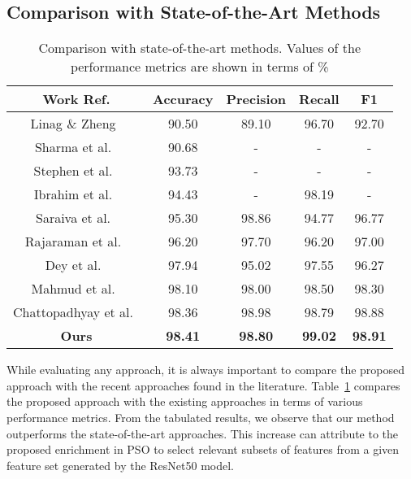 \documentclass[final,3p,times]{elsarticle}
\begin{document}
\subsection{Comparison with State-of-the-Art Methods}
\begin{table}[ht!]
    \centering
    \caption{Comparison with state-of-the-art methods. Values of the performance metrics are shown in terms of \%}
    \begin{adjustbox}{max width=\linewidth}
    \begin{tabular}{c|cccc}
    \toprule
        Work Ref. & Accuracy & Precision & Recall & F1  \\
        \midrule
        Linag \& Zheng~\cite{liang2020transfer} & 90.50 & 89.10 & 96.70& 92.70\\
        Sharma et al.~\cite{sharma2020feature}& 90.68 & - & - & -\\
        Stephen et al.~\cite{stephen2019efficient} & 93.73 & - & - & -\\
        Ibrahim et al.~\cite{ibrahim2021Pneumonia} & 94.43 & - & 98.19 & -\\
        Saraiva et al.~\cite{saraiva2019classification} & 95.30 & 98.86 & 94.77 & 96.77\\
        Rajaraman et al.~\cite{rajaraman2018visualization} & 96.20 & 97.70 & 96.20 & 97.00\\
        Dey et al.~\cite{dey2021customized} & 97.94& 95.02& 97.55& 96.27\\
        Mahmud et al.~\cite{mahmud2020covxnet} & 98.10 & 98.00& 98.50& 98.30\\
        Chattopadhyay et al.~\cite{chattopadhyay2021Pneumonia} & 98.36 & 98.98 & 98.79 & 98.88\\
        \midrule
        \textbf{Ours} & \textbf{98.41} & \textbf{98.80} & \textbf{99.02} & \textbf{98.91}\\
        \bottomrule
    \end{tabular}
    \end{adjustbox}
    \label{tab:sota}
\end{table}
While evaluating any approach, it is always important to compare {the proposed approach} with the {recent approaches} found in the literature. Table~\ref{tab:sota} compares the proposed approach with the existing approaches in terms of various performance metrics. From the tabulated {results,} we observe that our method outperforms the state-of-the-art approaches. This increase can attribute to the proposed enrichment in PSO to select relevant subsets of features from a given feature set generated by the ResNet50 model.
\end{document}
